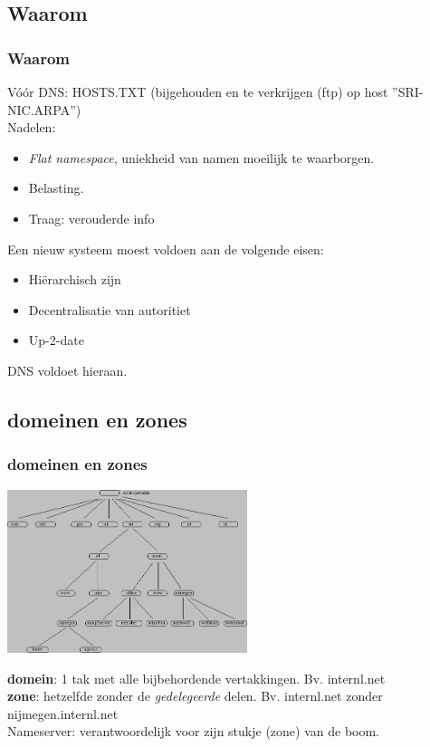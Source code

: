 \subsection{Waarom}
\begin{styleframe}
	\frametitle{Waarom}
V\'o\'or DNS: HOSTS.TXT (bijgehouden en te verkrijgen (ftp) op host ''SRI-NIC.ARPA'')\\
\pause
Nadelen:
\begin{itemize}
	\item {\it Flat namespace}, uniekheid van namen moeilijk te waarborgen.
	\item Belasting.
	\item Traag: verouderde info
\end{itemize}
\pause
Een nieuw systeem moest voldoen aan de volgende eisen:
\begin{itemize}
	\item Hi\"erarchisch zijn
	\item Decentralisatie van autoritiet
	\item Up-2-date
\end{itemize}
\pause
DNS voldoet hieraan.
\end{styleframe}

\subsection{domeinen en zones}
\begin{styleframe}
	\frametitle{domeinen en zones}
\begin{center}
\includegraphics[width=7cm]{img/dnshierarchie.png}\\
\end{center}
\pause
{\bf domein}: 1 tak met alle bijbehordende vertakkingen. Bv. internl.net\\
\pause
{\bf zone}: hetzelfde zonder de {\it gedelegeerde} delen. Bv. internl.net zonder nijmegen.internl.net\\
Nameserver: verantwoordelijk voor zijn stukje (zone) van de boom.
\end{styleframe}

